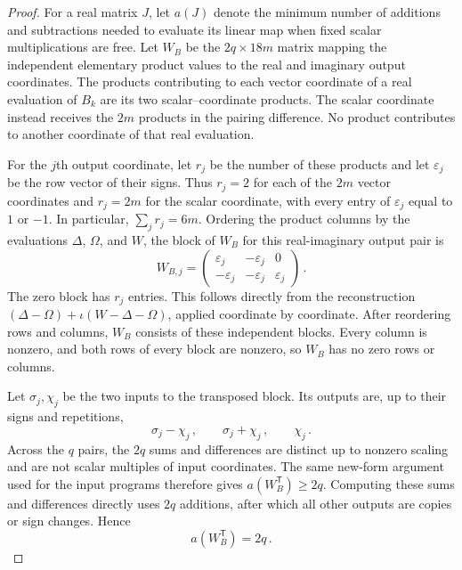\documentclass[11pt,reqno]{amsart}
\numberwithin{equation}{section}
\begin{document}
\begin{proof}
For a real matrix $J$, let $a(J)$ denote the minimum number of additions
and subtractions needed to evaluate its linear map when fixed scalar
multiplications are free. Let $W_B$ be the $2q\times18m$ matrix mapping
the independent elementary product values to the real and imaginary
output coordinates. The products contributing to each vector coordinate
of a real evaluation of $B_k$ are its two scalar--coordinate products.
The scalar coordinate instead receives the $2m$ products in the pairing
difference. No product contributes to another coordinate of that real
evaluation.

For the $j$th output coordinate, let $r_j$ be the number of these
products and let $\varepsilon_j$ be the row vector of their signs.
Thus $r_j=2$ for each of the $2m$ vector coordinates and $r_j=2m$ for
the scalar coordinate, with every entry of $\varepsilon_j$ equal to
$1$ or $-1$. In particular, $\sum_j r_j=6m$. Ordering the product
columns by the evaluations $\Delta$, $\Omega$, and $W$, the block of
$W_B$ for this real-imaginary output pair is
\[
W_{B,j}=
\begin{pmatrix}
\varepsilon_j&-\varepsilon_j&0\\
-\varepsilon_j&-\varepsilon_j&\varepsilon_j
\end{pmatrix}\,.
\]
The zero block has $r_j$ entries. This follows directly from the
reconstruction $(\Delta-\Omega)+\iota(W-\Delta-\Omega)$, applied
coordinate by coordinate. After reordering rows and columns, $W_B$
consists of these independent blocks. Every column is nonzero, and both
rows of every block are nonzero, so $W_B$ has no zero rows or columns.

Let $\sigma_j,\chi_j$ be the two inputs to the transposed block. Its
outputs are, up to their signs and repetitions,
\[
\sigma_j-\chi_j\,,\qquad \sigma_j+\chi_j\,,\qquad\chi_j\,.
\]
Across the $q$ pairs, the $2q$ sums and differences are distinct up to
nonzero scaling and are not scalar multiples of input coordinates.
The same new-form argument used for the input programs therefore gives
$a(W_B^{\mathsf T})\ge2q$. Computing these sums and differences directly
uses $2q$ additions, after which all other outputs are copies or sign
changes. Hence
\[
a(W_B^{\mathsf T})=2q\,.
\]


\end{proof}
\end{document}
